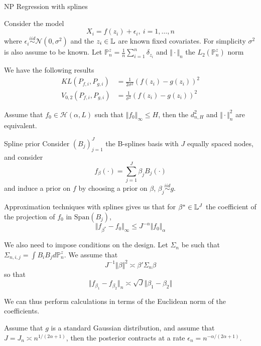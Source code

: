 % 





{NP Regression with splines}

Consider the model 
$$
X_i = f(z_i) + \epsilon_i, ~ i=1, \dots, n
$$
where $\epsilon_i \overset{iid}{\sim} \mathcal{N}(0,\sigma^2)$ and the $z_i\in \mathbb{L}$ are known fixed covariates. For simplicity $\sigma^2$ is also assume to be known.  
Let $\mathbb{P}_n^z = \frac{1}{n} \sum_{i=1}^n \delta_{z_i}$ and $\Vert \cdot \Vert_n$ the $L_2(\mathbb{P}_n^z)$ norm


\begin{lemma}
We have the following results
\begin{align*}
KL(P_{f,i},P_{g,i}) &= \frac{1}{2\sigma^2} (f(z_i) - g(z_i))^2 \\ 
 V_{0,2}(P_{f,i},P_{g,i}) &=\frac{1}{\sigma^2} (f(z_i) - g(z_i))^2 
\end{align*}
\end{lemma}





Assume that $f_0 \in \mathcal{H}(\alpha,L)$ such that $\Vert f_0 \Vert_\infty \leq H$, then the $d_{n,H}^2$ and $\Vert \cdot \Vert_n^2$ are equivalent. 
 
\begin{block}{Spline prior}
Consider $(B_j)_{j=1}^J$ the B-splines basis with $J$ equally spaced nodes, and consider 
$$
f_\beta(\cdot) = \sum_{j=1}^J \beta_j B_j(\cdot)
$$ 
and induce a prior on $f$ by choosing a prior on $\beta$, 
$\beta_j \overset{iid}{\sim} g $.
\end{block}
 
Approximation techniques with splines gives us that for $\beta^* \in \mathbb{L}^J$ the coefficient of the projection of $f_0$ in $\mathrm{Span}(B_j)$, 
$$
\Vert f_{\beta^*} - f_0 \Vert_\infty \leq J^{-\alpha} \Vert f_0 \Vert_\alpha 
$$ 


We also need to impose conditions on the design. Let $\Sigma_n$ be such that $\Sigma_{n,i,j} = \int B_i B_j d\mathbb{P}_n^z$. We assume that 
$$
J^{-1} \Vert \beta\Vert^2 \asymp \beta' \Sigma_n \beta   
$$ 
so that 
$$
\Vert f_{\beta_1} - f_{\beta_2} \Vert_n \asymp \sqrt{J} \Vert \beta_1 - \beta_2 \Vert
$$

We can thus perform calculations in terms of the Euclidean norm of the coefficients.




\begin{theorem}
Assume that $g$ is a standard Gaussian distribution, and assume that $J = J_n \asymp n^{1/(2\alpha + 1)}$, then the posterior contracts at a rate $\epsilon_n = n^{-\alpha/(2\alpha + 1)}$. 
\end{theorem}
 
